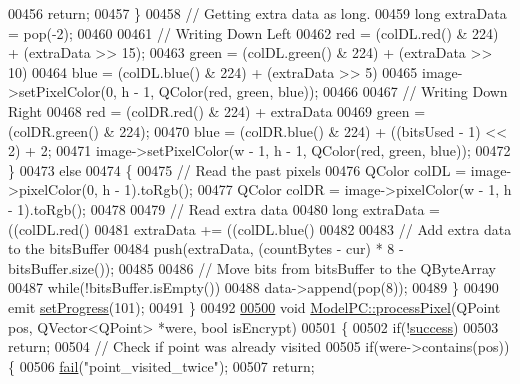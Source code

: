 \begin{DoxyCode}
00456             \textcolor{keywordflow}{return};
00457         \}
00458         \textcolor{comment}{// Getting extra data as long.}
00459         \textcolor{keywordtype}{long} extraData = pop(-2);
00460 
00461         \textcolor{comment}{// Writing Down Left}
00462         red = (colDL.red() & 224) + (extraData >> 15);
00463         green = (colDL.green() & 224) + (extraData >> 10) %
00464         blue = (colDL.blue() & 224) + (extraData >> 5) %
00465         image->setPixelColor(0, h - 1, QColor(red, green, blue));
00466 
00467         \textcolor{comment}{// Writing Down Right}
00468         red = (colDR.red() & 224) + extraData %
00469         green = (colDR.green() & 224);
00470         blue = (colDR.blue() & 224) + ((bitsUsed - 1) << 2) + 2;
00471         image->setPixelColor(w - 1, h - 1, QColor(red, green, blue));
00472     \}
00473     \textcolor{keywordflow}{else}
00474     \{
00475         \textcolor{comment}{// Read the past pixels}
00476         QColor colDL = image->pixelColor(0, h - 1).toRgb();
00477         QColor colDR = image->pixelColor(w - 1, h - 1).toRgb();
00478 
00479         \textcolor{comment}{// Read extra data}
00480         \textcolor{keywordtype}{long} extraData = ((colDL.red() %
00481         extraData += ((colDL.blue() %
00482 
00483         \textcolor{comment}{// Add extra data to the bitsBuffer}
00484         push(extraData, (countBytes - cur) * 8 - bitsBuffer.size());
00485 
00486         \textcolor{comment}{// Move bits from bitsBuffer to the QByteArray}
00487         \textcolor{keywordflow}{while}(!bitsBuffer.isEmpty())
00488             data->append(pop(8));
00489     \}
00490     emit \hyperlink{class_model_p_c_afdcd80f0ed5062e145a71f09b0897547}{setProgress}(101);
00491 \}
00492 
\hypertarget{modelpc_8cpp_source.tex_l00500}{}\hyperlink{class_model_p_c_a1171f9fe1550133dc9053a46b4e5bcfd}{00500} \textcolor{keywordtype}{void} \hyperlink{class_model_p_c_a1171f9fe1550133dc9053a46b4e5bcfd}{ModelPC::processPixel}(QPoint pos, QVector<QPoint> *were, \textcolor{keywordtype}{bool} isEncrypt)
00501 \{
00502     \textcolor{keywordflow}{if}(!\hyperlink{class_model_p_c_a945ffbbc44a832b953c191debd448f4c}{success})
00503         \textcolor{keywordflow}{return};
00504     \textcolor{comment}{// Check if point was already visited}
00505     \textcolor{keywordflow}{if}(were->contains(pos))\{
00506         \hyperlink{class_model_p_c_a47464b59b7e37fcee25e55475708aabd}{fail}(\textcolor{stringliteral}{"point\_visited\_twice"});
00507         \textcolor{keywordflow}{return};

\end{DoxyCode}
